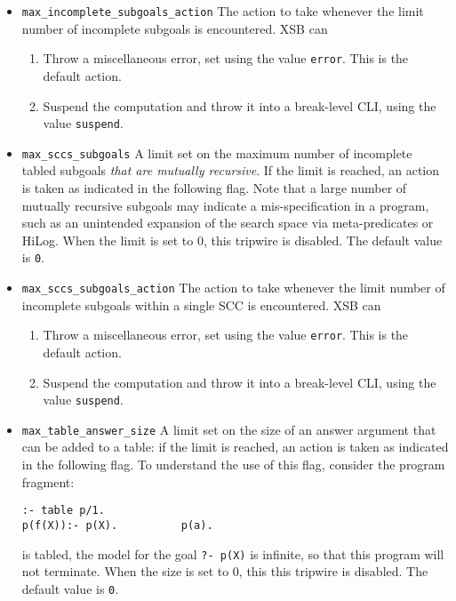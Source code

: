\begin{description}
\begin{itemize}
\item {\tt max\_incomplete\_subgoals\_action} The action to take
  whenever the limit number of incomplete subgoals is encountered.
  XSB can
\begin{enumerate}
\item Throw a miscellaneous error, set using the value {\tt error}.
  This is the default action.
%
\item Suspend the computation and throw it into a break-level CLI,
  using the value {\tt suspend}.
%
\end{enumerate}

\item {\tt max\_sccs\_subgoals} A limit set on the maximum number of
  incomplete tabled subgoals {\em that are mutually recursive}.  If
  the limit is reached, an action is taken as indicated in the
  following flag.  Note that a large number of mutually recursive
  subgoals may indicate a mis-specification in a program, such as an
  unintended expansion of the search space via meta-predicates or
  HiLog.  When the limit is set to 0, this tripwire is disabled.
  The default value is {\tt 0}.

\item {\tt max\_sccs\_subgoals\_action} The action to take whenever
  the limit number of incomplete subgoals within a single SCC is
  encountered.  XSB can
\begin{enumerate}
\item Throw a miscellaneous error, set using the value {\tt error}.
  This is the default action.
%
\item Suspend the computation and throw it into a break-level CLI,
  using the value {\tt suspend}.
%
\end{enumerate}


\item {\tt max\_table\_answer\_size} A limit set on the size of an
  answer argument that can be added to a table: if the limit is
  reached, an action is taken as indicated in the following flag.  To
  understand the use of this flag, consider the program fragment:
\begin{verbatim}
:- table p/1.
p(f(X)):- p(X).          p(a).
\end{verbatim}
  is tabled, the model for the goal {\tt ?- p(X)} is infinite, so that
  this program will not terminate.  When the size is set to 0, this
  this tripwire is disabled.  The default value is {\tt 0}.


\end{itemize}
\end{description}
